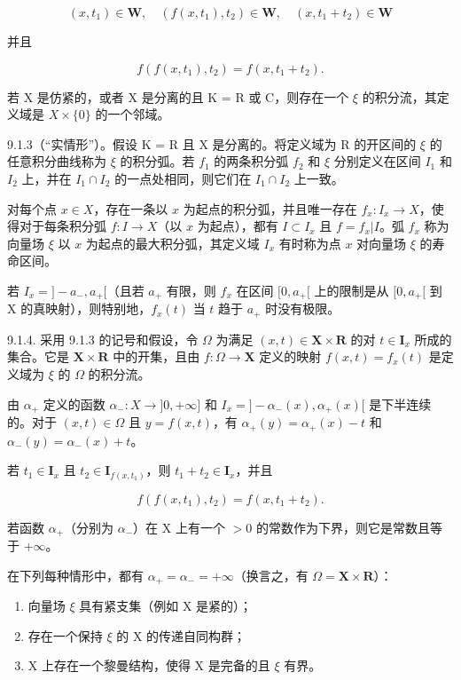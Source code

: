 \[
(x, t _ {1}) \in \mathbf {W}, \quad (f (x, t _ {1}), t _ {2}) \in \mathbf {W}, \quad (x, t _ {1} + t _ {2}) \in \mathbf {W}
\]

并且

\[
f (f (x, t _ {1}), t _ {2}) = f (x, t _ {1} + t _ {2}).\tag{2}
\]

若 X 是仿紧的，或者 X 是分离的且 K = R 或 C，则存在一个 \(\xi\) 的积分流，其定义域是 \(X \times \{0\}\) 的一个邻域。

9.1.3（“实情形”）。假设 K = R 且 X 是分离的。将定义域为 R 的开区间的 \(\xi\) 的任意积分曲线称为 \(\xi\) 的积分弧。若 \(f_{1}\) 的两条积分弧 \(f_{2}\) 和 \(\xi\) 分别定义在区间 \(I_{1}\) 和 \(I_{2}\) 上，并在 \(I_{1} \cap I_{2}\) 的一点处相同，则它们在 \(I_{1} \cap I_{2}\) 上一致。

对每个点 \(x \in X\)，存在一条以 \(x\) 为起点的积分弧，并且唯一存在 \(f_x: I_x \to X\)，使得对于每条积分弧 \(f: I \to X\)（以 \(x\) 为起点），都有 \(I \subset I_x\) 且 \(f = f_x|I\)。弧 \(f_x\) 称为向量场 \(\xi\) 以 \(x\) 为起点的最大积分弧，其定义域 \(I_x\) 有时称为点 \(x\) 对向量场 \(\xi\) 的寿命区间。

若 \(I_x = ]-a_-,a_+[\)（且若 \(a_+\) 有限，则 \(f_x\) 在区间 \([0,a_+[\) 上的限制是从 \([0,a_+[\) 到 X 的真映射），则特别地，\(f_x(t)\) 当 \(t\) 趋于 \(a_+\) 时没有极限。

9.1.4. 采用 9.1.3 的记号和假设，令 \(\Omega\) 为满足 \((x,t)\in\mathbf{X}\times\mathbf{R}\) 的对 \(t\in\mathbf{I}_{x}\) 所成的集合。它是 \(\mathbf{X}\times\mathbf{R}\) 中的开集，且由 \(f\colon\Omega\to\mathbf{X}\) 定义的映射 \(f(x,t)=f_{x}(t)\) 是定义域为 \(\xi\) 的 \(\Omega\) 的积分流。

由 \(\alpha_{+}\) 定义的函数 \(\alpha_{-}: X \to ]0,+\infty]\) 和 \(I_{x} = ]-\alpha_{-}(x),\alpha_{+}(x)[\) 是下半连续的。对于 \((x, t) \in \Omega\) 且 \(y = f(x, t)\)，有 \(\alpha_{+}(y) = \alpha_{+}(x) - t\) 和 \(\alpha_{-}(y) = \alpha_{-}(x) + t\)。

若 \(t_1 \in \mathbf{I}_x\) 且 \(t_2 \in \mathbf{I}_{f(x, t_1)}\)，则 \(t_1 + t_2 \in \mathbf{I}_x\)，并且

\[
f (f (x, t _ {1}), t _ {2}) = f (x, t _ {1} + t _ {2}).\tag{3}
\]

若函数 \(\alpha_{+}\)（分别为 \(\alpha_{-}\)）在 X 上有一个 \(>0\) 的常数作为下界，则它是常数且等于 \(+\infty\)。

在下列每种情形中，都有 \(\alpha_{+} = \alpha_{-} = +\infty\)（换言之，有 \(\Omega = \mathbf{X} \times \mathbf{R}\)）：

\begin{enumerate}
\def\labelenumi{(\roman{enumi})}
\item
  向量场 \(\xi\) 具有紧支集（例如 X 是紧的）；
\item
  存在一个保持 \(\xi\) 的 X 的传递自同构群；
\item
  X 上存在一个黎曼结构，使得 X 是完备的且 \(\xi\) 有界。
\end{enumerate}

